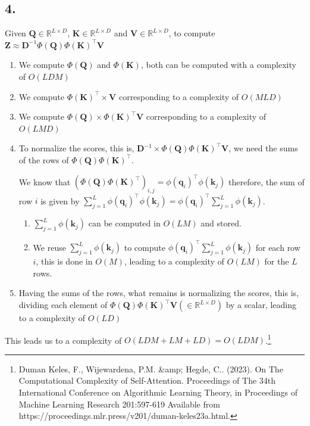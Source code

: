 \documentclass[11pt]{article}
\begin{document}
\subsection{4.}
Given $\bm{Q} \in \mathbb{R}^{L \times D}$, $\bm{K} \in \mathbb{R}^{L \times D}$ and $\bm{V} \in \mathbb{R}^{L \times D}$, to compute $\bm{Z} \approx \bm{D}^{-1} \Phi \left( \bm{Q} \right) \Phi \left( \bm{K} \right)^{\top} \bm{V}$
\begin{enumerate}
\item We compute $\Phi \left( \bm{Q} \right)$ and $\Phi \left( \bm{K} \right)$, both can be computed with a complexity of $O \left( L D M\right)$
\item We compute $\Phi \left( \bm{K} \right)^{\top} \times \bm{V}$ corresponding to a complexity of $O \left(M L D \right)$
\item We compute $\Phi \left( \bm{Q} \right) \times \Phi \left( \bm{K} \right)^{\top} \bm{V}$ corresponding to a complexity of $O \left( L M D \right)$
\item To normalize the scores, this is, $\bm{D}^{-1} \times \Phi \left( \bm{Q} \right) \Phi \left( \bm{K} \right)^{\top} \bm{V}$, we need the sums of the rows of $\Phi \left( \bm{Q} \right) \Phi \left( \bm{K} \right)^{\top}$.

  We know that $\left( \Phi \left( \bm{Q} \right) \Phi \left( \bm{K} \right)^{\top} \right)_{i, j} = \phi \left( \bm{q}_{i} \right)^{\top} \phi \left( \bm{k}_{j} \right)$ therefore, the sum of row $i$ is given by $\sum_{j = 1}^{L} \phi \left( \bm{q}_{i} \right)^{\top} \phi \left( \bm{k}_{j} \right) = \phi \left( \bm{q}_{i} \right)^{\top} \sum_{j = 1}^{L} \phi \left( \bm{k}_{j} \right)$.
  \begin{enumerate}
  \item $\sum_{j = 1}^{L} \phi \left( \bm{k}_{j} \right)$ can be computed in $O \left( L M \right)$ and stored.
  \item We reuse $\sum_{j = 1}^{L} \phi \left( \bm{k}_{j} \right)$ to compute $\phi \left( \bm{q}_{i} \right)^{\top} \sum_{j = 1}^{L} \phi \left( \bm{k}_{j} \right)$ for each row $i$, this is done in $O \left( M \right)$, leading to a complexity of $O \left( L M \right)$ for the $L$ rows.
  \end{enumerate}
\item Having the sums of the rows, what remains is normalizing the scores, this is, dividing each element of $\Phi \left( \bm{Q} \right) \Phi \left( \bm{K} \right)^{\top} \bm{V} \left( \in \mathbb{R}^{L \times D} \right)$ by a scalar, leading to a complexity of $O \left( LD \right)$
\end{enumerate}
This leads us to a complexity of $O \left( LDM + LM + LD \right) = O \left( LDM \right)$.\footnote{Duman Keles, F., Wijewardena, P.M. \&amp; Hegde, C.. (2023). On The Computational Complexity of Self-Attention. Proceedings of The 34th International Conference on Algorithmic Learning Theory, in Proceedings of Machine Learning Research 201:597-619 Available from https://proceedings.mlr.press/v201/duman-keles23a.html.}
\pagebreak
\end{document}
